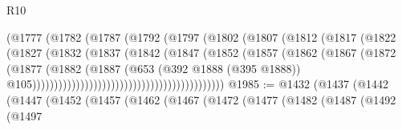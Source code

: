 \begin{lexlean}{R10}
\begin{coremodule}
                                            (@1777
                                              (@1782
                                                (@1787
                                                  (@1792
                                                    (@1797
                                                      (@1802
                                                        (@1807
                                                          (@1812
                                                            (@1817
                                                              (@1822
                                                                (@1827
                                                                  (@1832
                                                                    (@1837
                                                                      (@1842
                                                                        (@1847
                                                                          (@1852
                                                                            (@1857
                                                                              (@1862
                                                                                (@1867
                                                                                  (@1872
                                                                                    (@1877
                                                                                      (@1882
                                                                                        (@1887
                                                                                          (@653
                                                                                            (@392
                                                                                              @1888
                                                                                              (@395
                                                                                                @1888))
                                                                                            @105))))))))))))))))))))))))))))))))))))))))))))
@1985 := @1432
    (@1437
      (@1442
        (@1447
          (@1452
            (@1457
              (@1462
                (@1467
                  (@1472
                    (@1477
                      (@1482
                        (@1487
                          (@1492
                            (@1497

\end{coremodule}
\end{lexlean}
